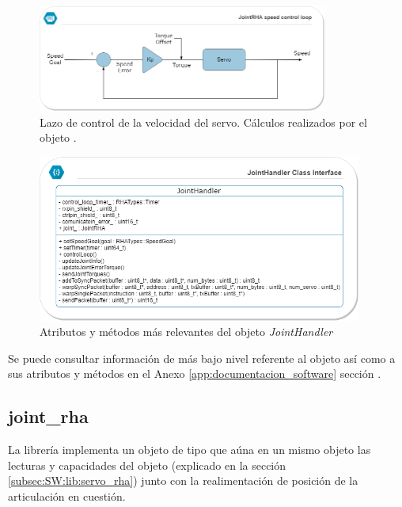         \begin{figure}[H]
        \centering
        \includegraphics[width=0.85\textwidth]{figuras/SW/servo_control_loop.png}   
        \caption{Lazo de control de la velocidad del servo. Cálculos realizados por el objeto .}
        \label{fig:SW:servo_control_loop}
        \end{figure}
            
        \begin{figure}[H]
            \centering
            \includegraphics[width=0.95\textwidth]{figuras/SW/class_diagram_JH.png}   
            \caption{Atributos y métodos más relevantes del objeto \textit{JointHandler}}
            \label{fig:SW:class_diagram_JH}
        \end{figure}
        
        Se puede consultar información de más bajo nivel referente al objeto  así como a sus atributos y métodos en el Anexo \ref{app:documentacion_software} sección \completar.
    
    \subsection{joint\_rha} \label{subsec:SW:lib:joint_rha}
        La librería  implementa un objeto de tipo  que aúna en un mismo objeto las lecturas y capacidades del objeto  (explicado en la sección \ref{subsec:SW:lib:servo_rha}) junto con la realimentación de posición de la articulación en cuestión.
        
